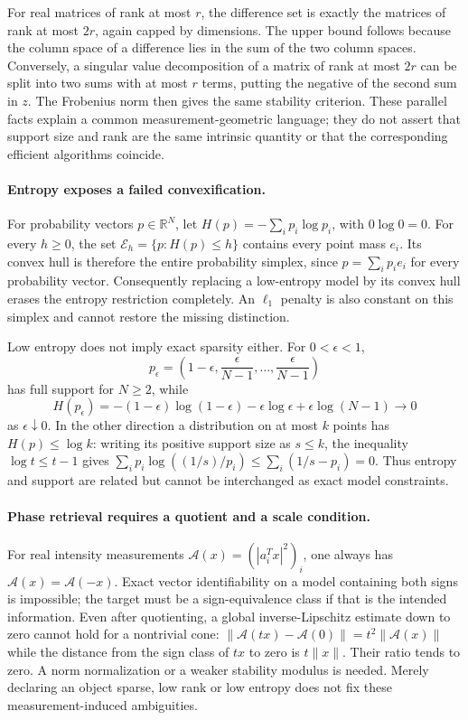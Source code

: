 \documentclass[11pt]{article}
\begin{document}
For real matrices of rank at most $r$, the difference set is exactly the matrices of rank at most $2r$, again capped by dimensions. The upper bound follows because the column space of a difference lies in the sum of the two column spaces. Conversely, a singular value decomposition of a matrix of rank at most $2r$ can be split into two sums with at most $r$ terms, putting the negative of the second sum in $z$. The Frobenius norm then gives the same stability criterion. These parallel facts explain a common measurement-geometric language; they do not assert that support size and rank are the same intrinsic quantity or that the corresponding efficient algorithms coincide.

\paragraph{Entropy exposes a failed convexification.}
For probability vectors $p\in\mathbb R^N$, let $H(p)=-\sum_i p_i\log p_i$, with $0\log0=0$. For every $h\ge0$, the set $\mathcal E_h=\{p:H(p)\le h\}$ contains every point mass $e_i$. Its convex hull is therefore the entire probability simplex, since $p=\sum_i p_i e_i$ for every probability vector. Consequently replacing a low-entropy model by its convex hull erases the entropy restriction completely. An $\ell_1$ penalty is also constant on this simplex and cannot restore the missing distinction.

Low entropy does not imply exact sparsity either. For $0<\epsilon<1$,
\[
 p_\epsilon=\left(1-\epsilon,\frac{\epsilon}{N-1},\ldots,
                              \frac{\epsilon}{N-1}\right)
\]
has full support for $N\ge2$, while
\[
 H(p_\epsilon)=-(1-\epsilon)\log(1-\epsilon)-\epsilon\log\epsilon
                         +\epsilon\log(N-1)\longrightarrow0
\]
as $\epsilon\downarrow0$. In the other direction a distribution on at most $k$ points has $H(p)\le\log k$: writing its positive support size as $s\le k$, the inequality $\log t\le t-1$ gives $\sum_i p_i\log((1/s)/p_i)\le\sum_i(1/s-p_i)=0$. Thus entropy and support are related but cannot be interchanged as exact model constraints.

\paragraph{Phase retrieval requires a quotient and a scale condition.}
For real intensity measurements $\mathcal A(x)=(|a_i^Tx|^2)_i$, one always has $\mathcal A(x)=\mathcal A(-x)$. Exact vector identifiability on a model containing both signs is impossible; the target must be a sign-equivalence class if that is the intended information. Even after quotienting, a global inverse-Lipschitz estimate down to zero cannot hold for a nontrivial cone: $\|\mathcal A(tx)-\mathcal A(0)\|=t^2\|\mathcal A(x)\|$ while the distance from the sign class of $tx$ to zero is $t\|x\|$. Their ratio tends to zero. A norm normalization or a weaker stability modulus is needed. Merely declaring an object sparse, low rank or low entropy does not fix these measurement-induced ambiguities.
\end{document}
